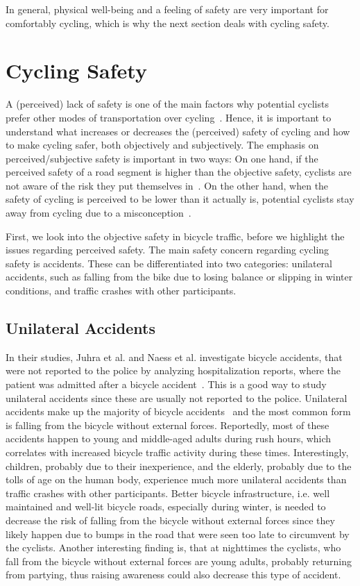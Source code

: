 In general, physical well-being and a feeling of safety are very important for comfortably cycling, which is why the next section deals with cycling safety.
  

\section{Cycling Safety}
\label{sec:cycling_safety_background}
A (perceived) lack of safety is one of the main factors why potential cyclists prefer other modes of transportation over cycling~\cite{felix2020build,nazemi2021studying,lawson2013perception}.
Hence, it is important to understand what increases or decreases the (perceived) safety of cycling and how to make cycling safer, both objectively and subjectively.
The emphasis on perceived/subjective safety is important in two ways:
On one hand, if the perceived safety of a road segment is higher than the objective safety, cyclists are not aware of the risk they put themselves in~\cite{christ2023perceiving}.
On the other hand, when the safety of cycling is perceived to be lower than it actually is, potential cyclists stay away from cycling due to a misconception~\cite{noland1995perceived}.

First, we look into the objective safety in bicycle traffic, before we highlight the issues regarding perceived safety.
The main safety concern regarding cycling safety is accidents.
These can be differentiated into two categories:  unilateral accidents, such as falling from the bike due to losing balance or slipping in winter conditions, and traffic crashes with other participants.

\subsection*{Unilateral Accidents}
In their studies, Juhra et al. and Naess et al. investigate bicycle accidents, that were not reported to the police by analyzing hospitalization reports, where the patient was admitted after a bicycle accident~\cite{juhra2012bicycle,naess2020number}.
This is a good way to study unilateral accidents since these are usually not reported to the police.
Unilateral accidents make up the majority of bicycle accidents~\cite{juhra2012bicycle,naess2020number} and the most common form is falling from the bicycle without external forces.
Reportedly, most of these accidents happen to young and middle-aged adults during rush hours, which correlates with increased bicycle traffic activity during these times.
Interestingly, children, probably due to their inexperience, and the elderly, probably due to the tolls of age on the human body, experience much more unilateral accidents than traffic crashes with other participants.
Better bicycle infrastructure, i.e. well maintained and well-lit bicycle roads, especially during winter, is needed to decrease the risk of falling from the bicycle without external forces since they likely happen due to bumps in the road that were seen too late to circumvent by the cyclists.
Another interesting finding is, that at nighttimes the cyclists, who fall from the bicycle without external forces are young adults, probably returning from partying, thus raising awareness could also decrease this type of accident.

